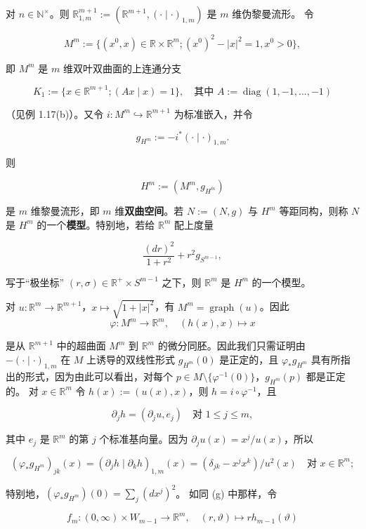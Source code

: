 \begin{example}
\begin{items}
对 $ n \in \mathbb{N}^\times $。则 $ \mathbb{R}^{m+1}_{1,m} := (\mathbb{R}^{m+1}, (\cdot\mid\cdot)_{1,m}) $ 是 $ m $ 维伪黎曼流形。
令

\[
M^m := \{ (x^0, x) \in \mathbb{R} \times \mathbb{R}^m ; (x^0)^2 - |x|^2 = 1, x^0 > 0 \},
\]

即 $ M^m $ 是 $ m $ 维双叶双曲面的上连通分支

\[
K_1 := \{ x \in \mathbb{R}^{m+1} ; (Ax\mid x) = 1 \}, \quad \text{其中 } A := \operatorname{diag}(1, -1, \ldots, -1)
\]

（见例 1.17(b)）。又令 $ i : M^m \hookrightarrow \mathbb{R}^{m+1} $ 为标准嵌入，并令

\[
g_{H^m} := -i^*(\cdot\mid\cdot)_{1,m}.
\]

则

\[
H^m := (M^m, g_{H^m})
\]

是 $ m $ 维黎曼流形，即 $ m $ 维\textbf{双曲空间}。若 $ N := (N, g) $ 与 $ H^m $ 等距同构，则称 $ N $ 是 $ H^m $ 的一个\textbf{模型}。特别地，若给 $ \mathbb{R}^m $ 配上度量

\[
\frac{(dr)^2}{1+r^2} + r^2 g_{S^{m-1}},
\]

写于“极坐标” $ (r, \sigma) \in \mathbb{R}^+ \times S^{m-1} $ 之下，则 $ \mathbb{R}^m $ 是 $ H^m $ 的一个模型。

\proofhead
对 $ u : \mathbb{R}^m \to \mathbb{R}^{m+1} $，$ x \mapsto \sqrt{1+|x|^2} $，有 $ M^m = \operatorname{graph}(u) $。因此
\[
\varphi : M^m \to \mathbb{R}^m, \quad (h(x), x) \mapsto x
\]

是从 $ \mathbb{R}^{m+1} $ 中的超曲面 $ M^m $ 到 $ \mathbb{R}^m $ 的微分同胚。因此我们只需证明由 $ -(\cdot\mid\cdot)_{1,m} $ 在 $ M $ 上诱导的双线性形式 $ g_{H^m}(0) $ 是正定的，且 $ \varphi_* g_{H^m} $ 具有所指出的形式，因为由此可以看出，对每个 $ p \in M \setminus \{\varphi^{-1}(0)\} $，$ g_{H^m}(p) $ 都是正定的。
对 $ x \in \mathbb{R}^m $ 令 $ h(x) := (u(x), x) $，则 $ h = i \circ \varphi^{-1} $，且

\[
\partial_j h = (\partial_j u, e_j) \quad \text{对 } 1 \le j \le m,
\]

其中 $ e_j $ 是 $ \mathbb{R}^m $ 的第 $ j $ 个标准基向量。因为 $ \partial_j u(x) = x^j/u(x) $，所以

\[
(\varphi_* g_{H^m})_{jk}(x) = (\partial_j h \mid \partial_k h)_{1,m}(x) = (\delta_{jk} - x^j x^k)/u^2(x) \quad \text{对 } x \in \mathbb{R}^m;
\]

特别地，$ (\varphi_* g_{H^m})(0) = \sum_j (dx^j)^2 $。
如同 (g) 中那样，令

\[
f_m : (0, \infty) \times W_{m-1} \to \mathbb{R}^m, \quad (r, \vartheta) \mapsto r h_{m-1}(\vartheta)
\]


\end{items}
\end{example}
